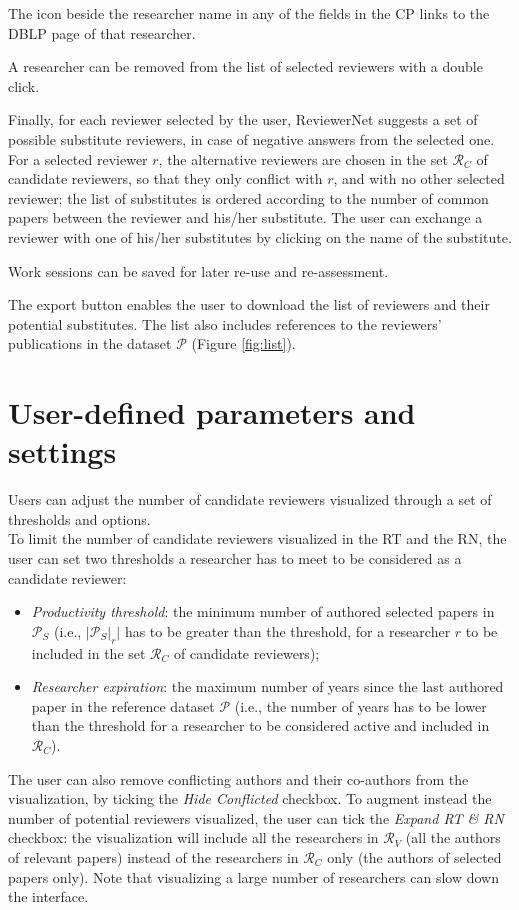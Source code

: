 The icon beside the researcher name in any of the fields in the CP links to the DBLP page of that researcher. 

A researcher can be removed from the list of selected reviewers with a double click.

Finally, for each reviewer selected by the user, ReviewerNet suggests a set of possible substitute reviewers, in case of negative answers from the selected one. For a selected reviewer $r$, the alternative reviewers are chosen in the set $\mathcal{R}_C$ of candidate reviewers, so that they only conflict with $r$, and with no other selected reviewer; the list of substitutes is ordered according to the number of common papers between the reviewer and his/her substitute. The user can exchange a reviewer with one of his/her substitutes by clicking on the name of the substitute.

Work sessions can be saved for later re-use and re-assessment.

The export button enables the user to download the list of reviewers and their potential substitutes. The list also includes references to the reviewers' publications in the dataset $\mathcal{P}$ (Figure \ref{fig:list}).  

\section{User-defined parameters and settings}
\label{subsec:parameters}

Users can adjust the number of candidate reviewers visualized through a set of thresholds and options. \\

To limit the number of candidate reviewers visualized in the RT and the RN, the user can set two thresholds a researcher has to meet to be considered as a candidate reviewer: 
\begin{itemize}
\item \emph{Productivity threshold}: the minimum number of authored selected papers in $\mathcal{P}_S$ (i.e., $\vert \mathcal{P}_{S}|_{r} \vert$ has to be greater than the threshold, for a researcher $r$ to be included in the set $\mathcal{R}_C$ of candidate reviewers);
\item \emph{Researcher expiration}: the maximum number of years since the last authored paper in the reference dataset $\mathcal{P}$ (i.e., the number of years has to be lower than the threshold for a researcher to be considered active and included in $\mathcal{R}_C$).
\end{itemize}
The user can also remove conflicting authors and their co-authors from the visualization, by ticking the \emph{Hide Conflicted} checkbox.
To augment instead the number of potential reviewers visualized, the user can tick the \emph{Expand RT \& RN} checkbox: the visualization will include all the researchers in $\mathcal{R}_V$ (all the authors of relevant papers) instead of the researchers in $\mathcal{R}_C$ only (the authors of selected papers only). Note that visualizing a large number of researchers can slow down the interface. \\

